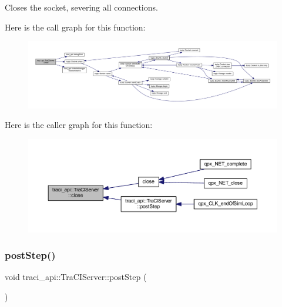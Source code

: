 Closes the socket, severing all connections. 

Here is the call graph for this function\+:
\nopagebreak
\begin{figure}[H]
\begin{center}
\leavevmode
\includegraphics[width=350pt]{classtraci__api_1_1_tra_c_i_server_a1fd920907cde7ef5a10d078aec34080a_cgraph}
\end{center}
\end{figure}
Here is the caller graph for this function\+:
\nopagebreak
\begin{figure}[H]
\begin{center}
\leavevmode
\includegraphics[width=350pt]{classtraci__api_1_1_tra_c_i_server_a1fd920907cde7ef5a10d078aec34080a_icgraph}
\end{center}
\end{figure}
\mbox{\label{classtraci__api_1_1_tra_c_i_server_af4814a9a99d79f4e00fc102169d10cc2}} 
\subsubsection{\texorpdfstring{post\+Step()}{postStep()}}
{\footnotesize\ttfamily void traci\+\_\+api\+::\+Tra\+C\+I\+Server\+::post\+Step (\begin{DoxyParamCaption}{ }\end{DoxyParamCaption})}

